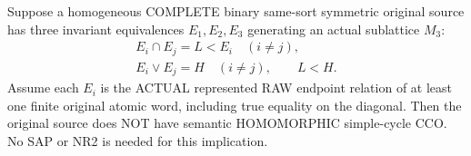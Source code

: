 \begin{lemma}
\label{lem:typed-exact-m3-cco-obstruction}
Suppose a homogeneous COMPLETE binary
same-sort symmetric original source has
three invariant equivalences
$E_1,E_2,E_3$ generating an actual
sublattice $M_3$:
\[
 \begin{gathered}
 E_i\cap E_j=L<E_i\quad(i\ne j),\\
 E_i\vee E_j=H\quad(i\ne j),
 \qquad L<H .
 \end{gathered}
\]
Assume each $E_i$ is the ACTUAL represented
RAW endpoint relation of at least one
finite original atomic word, including
true equality on the diagonal.
Then the original source does NOT have
semantic HOMOMORPHIC simple-cycle CCO.
No SAP or NR2 is needed for this implication.
\end{lemma}
